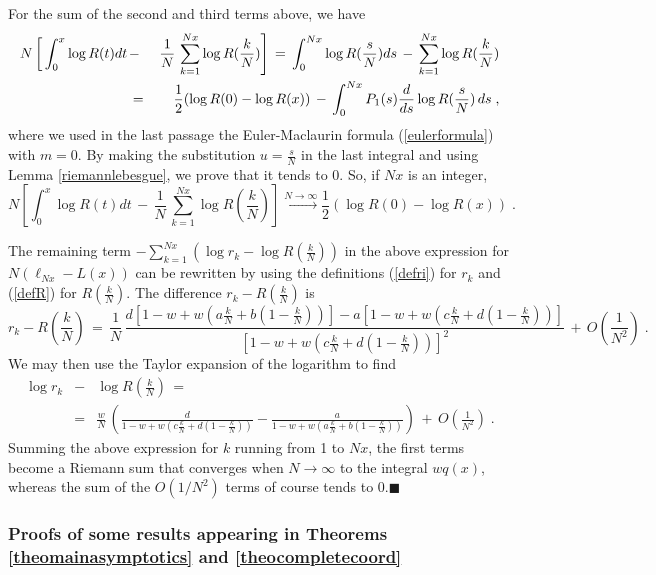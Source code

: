 \documentclass[12pt]{article}
\begin{document}
For the sum of the second and third terms above, we have
\begin{eqnarray}
N \left[\rule{0cm}{0.5cm} \int_0^x \log R(t)dt \right.&-& \left. \frac{1}{N} \,\sum_{k=1}^{Nx} \log  R(\frac{k}{N}) \right]  \,=\, \int_0^{Nx} \log R(\frac{s}{N}) ds \,-\, \sum_{k=1}^{Nx} \log  R(\frac{k}{N})\nonumber \\&=&\frac{1}{2} (\log R(0) - \log R(x)) \,-\, \int_0^{Nx} P_1(s) \frac{d}{ds} \log R(\frac{s}{N}) \,ds \;, \nonumber 
\end{eqnarray}
where we used  in the last passage the Euler-Maclaurin formula (\ref{eulerformula}) with $m=0$. By making the substitution $u=\frac{s}{N}$ in the last integral and using Lemma \ref{riemannlebesgue}, we prove that it tends to $0$. So, if $Nx$ is an integer,
\[ N \left[ \int_0^x \log R(t)dt \,-\, \frac{1}{N} \,\sum_{k=1}^{Nx} \log  R(\frac{k}{N}) \right] \stackrel{N \rightarrow \infty}{\rightarrow} \frac{1}{2} (\log R(0) - \log R(x))\;.\]

The remaining term $-\sum_{k=1}^{Nx} (\log r_k-\log R(\frac{k}{N}))$ in the above expression for $N (\ell_{Nx}-L(x))$ can be rewritten by using the definitions (\ref{defri}) for $r_k$ and (\ref{defR}) for $R(\frac{k}{N})$. The difference $r_k-R(\frac{k}{N})$ is 
\[r_k-R(\frac{k}{N}) \,=\, \frac{1}{N}\, \frac{d[1-w+w(a\frac{k}{N}+b(1-\frac{k}{N}))]-a[1-w+w(c\frac{k}{N}+d(1-\frac{k}{N}))]}{[1-w+w(c\frac{k}{N}+d(1-\frac{k}{N}))]^2} \,+\, O(\frac{1}{N^2})\;.\]
We may then use the Taylor expansion of the logarithm to find
\begin{eqnarray}
\log r_k &-& \log R(\frac{k}{N}) \,=\, \nonumber \\
&=&\frac{w}{N} \, \left(\frac{d}{1-w+w(c\frac{k}{N}+d(1-\frac{k}{N}))}- \frac{a}{1-w+w(a\frac{k}{N}+b(1-\frac{k}{N}))}\right) \,+\, O(\frac{1}{N^2})\;.\nonumber
\end{eqnarray}
Summing the above expression for $k$ running from 1 to $Nx$, the  first terms become a Riemann sum that converges when $N \rightarrow \infty$ to the integral $w q(x)$, whereas the sum of the $O(1/N^2)$ terms of course tends to 0.$\blacksquare$

\subsubsection{Proofs of some results appearing in Theorems \ref{theomainasymptotics} and \ref{theocompletecoord}}  \label{subsecinter}
\end{document}

